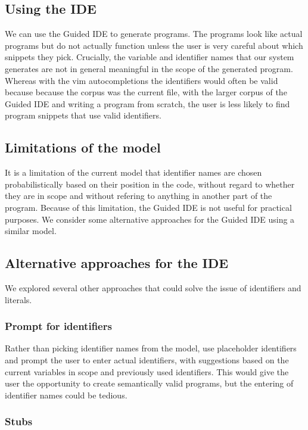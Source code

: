 \documentclass{article}
\begin{document}
\subsection{Using the IDE}

We can use the Guided IDE to generate programs. The programs look like actual
programs but do not actually function unless the user is very careful about
which snippets they pick. Crucially, the variable and identifier names that our
system generates are not in general meaningful in the scope of the generated
program.  Whereas with the vim autocompletions the identifiers would often be
valid because because the corpus was the current file, with the larger corpus of
the Guided IDE and writing a program from scratch, the user is less likely to
find program snippets that use valid identifiers.

\subsection{Limitations of the model}

It is a limitation of the current model that identifier names are chosen
probabilistically based on their position in the code, without regard to whether
they are in scope and without refering to anything in another part of the
program. Because of this limitation, the Guided IDE is not useful for practical
purposes. We consider some alternative approaches for the Guided IDE using a
similar model.

\subsection{Alternative approaches for the IDE}

We explored several other approaches that could solve the issue of identifiers and literals.

\subsubsection{Prompt for identifiers}

Rather than picking identifier names from the model, use placeholder identifiers
and prompt the user to enter actual identifiers, with suggestions based on the
current variables in scope and previously used identifiers. This would give the
user the opportunity to create semantically valid programs, but the entering of
identifier names could be tedious.

\subsubsection{Stubs}
\end{document}
